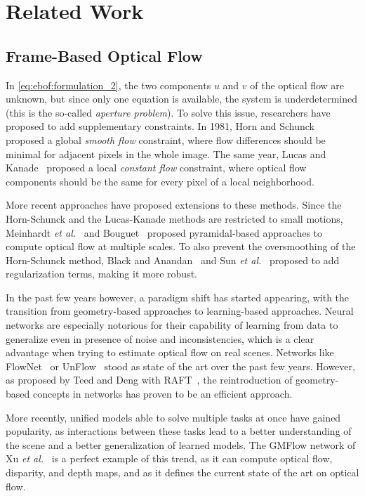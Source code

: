 \section{Related Work}\label{sec:ebof:sota}

\subsection{Frame-Based Optical Flow}
In \cref{eq:ebof:formulation_2}, the two components \(u\) and \(v\) of the optical flow are unknown, but since only one equation is available, the system is underdetermined (this is the so-called \textit{aperture problem}). To solve this issue, researchers have proposed to add supplementary constraints. In 1981, Horn and Schunck~\cite{Horn1981DeterminingOF} proposed a global \textit{smooth flow} constraint, where flow differences should be minimal for adjacent pixels in the whole image. The same year, Lucas and Kanade~\cite{Lucas1981AnII} proposed a local \textit{constant flow} constraint, where optical flow components should be the same for every pixel of a local neighborhood.

More recent approaches have proposed extensions to these methods. Since the Horn-Schunck and the Lucas-Kanade methods are restricted to small motions, Meinhardt \textit{et al.}~\cite{Meinhardt2013HornSchunckOF} and Bouguet~\cite{Bouguet1999PyramidalIO} proposed pyramidal-based approaches to compute optical flow at multiple scales. To also prevent the oversmoothing of the Horn-Schunck method, Black and Anandan~\cite{Black1996TheRE} and Sun \textit{et al.}~\cite{Sun2013AQA} proposed to add regularization terms, making it more robust.

In the past few years however, a paradigm shift has started appearing, with the transition from geometry-based approaches to learning-based approaches. Neural networks are especially notorious for their capability of learning from data to generalize even in presence of noise and inconsistencies, which is a clear advantage when trying to estimate optical flow on real scenes. Networks like FlowNet~\cite{Dosovitskiy2015FlowNetLO} or UnFlow~\cite{Meister2018UnFlowUL} stood as state of the art over the past few years. However, as proposed by Teed and Deng with RAFT~\cite{Teed2020RAFTRA}, the reintroduction of geometry-based concepts in networks has proven to be an efficient approach.

More recently, unified models able to solve multiple tasks at once have gained popularity, as interactions between these tasks lead to a better understanding of the scene and a better generalization of learned models. The GMFlow network of Xu \textit{et al.}~\cite{Xu2022UnifyingFS} is a perfect example of this trend, as it can compute optical flow, disparity, and depth maps, and as it defines the current state of the art on optical flow.


